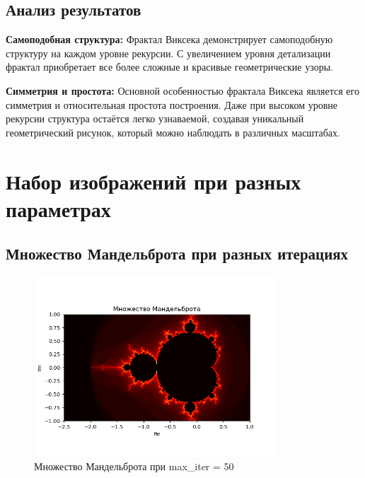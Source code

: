 \documentclass{article}
\begin{document}
	\subsection{Анализ результатов}
	\textbf{Самоподобная структура:} Фрактал Виксека демонстрирует самоподобную структуру на каждом уровне рекурсии. С увеличением уровня детализации фрактал приобретает все более сложные и красивые геометрические узоры.
	
	\textbf{Симметрия и простота:} Основной особенностью фрактала Виксека является его симметрия и относительная простота построения. Даже при высоком уровне рекурсии структура остаётся легко узнаваемой, создавая уникальный геометрический рисунок, который можно наблюдать в различных масштабах.
	
	\newpage
	
	\section{Набор изображений при разных параметрах}
	
	\subsection{Множество Мандельброта при разных итерациях}
	\begin{figure}[H]
		\centering
		\includegraphics[width=0.8\textwidth]{images/mandelbrot_iter50.png}
		\caption{Множество Мандельброта при max\_iter = 50}
		\label{fig:mandelbrot50}
	\end{figure}
	
\end{document}
